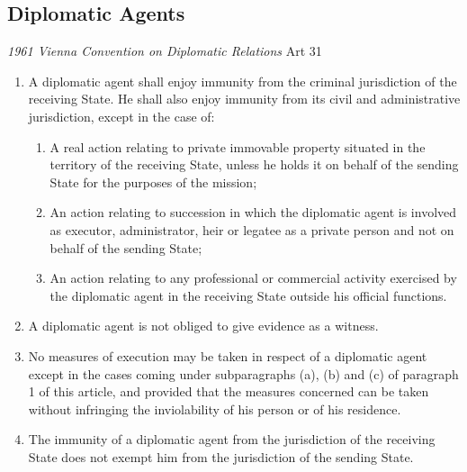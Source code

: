\subsection{Diplomatic Agents}

\begin{conventiondetails}{\textit{1961 Vienna Convention on Diplomatic Relations} Art 31}
    \flushleft
    \begin{enumerate}
        \item A diplomatic agent shall enjoy immunity from the criminal jurisdiction of the receiving State. He shall also enjoy immunity from its civil and administrative jurisdiction, except in the case of:
        \begin{enumerate}
            \item A real action relating to private immovable property situated in the territory of the receiving State, unless he holds it on behalf of the sending State for the purposes of the mission;
            \item An action relating to succession in which the diplomatic agent is involved as executor, administrator, heir or legatee as a private person and not on behalf of the sending State;
            \item An action relating to any professional or commercial activity exercised by the diplomatic agent in the receiving State outside his official functions.
        \end{enumerate}
        \item A diplomatic agent is not obliged to give evidence as a witness.
        \item No measures of execution may be taken in respect of a diplomatic agent except in the cases coming under subparagraphs (a), (b) and (c) of paragraph 1 of this article, and provided that the measures concerned can be taken without infringing the inviolability of his person or of his residence.
        \item The immunity of a diplomatic agent from the jurisdiction of the receiving State does not exempt him from the jurisdiction of the sending State.
    \end{enumerate}
\end{conventiondetails}

